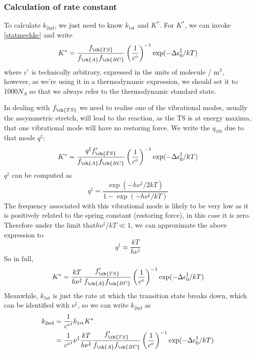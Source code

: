 \subsubsection{Calculation of rate constant}
To calculate $k_{\text{2nd}}$, we just need to know $k_{\text{1st}}$ and $K^*$. For $K^*$, we can invoke \cref{statmechkc} and write
\begin{equation}
  K^*=\frac{f_{\ch{TS}}}{f_{\ch{A}}f_{\ch{BC}}}\lf(\frac{1}{c^{\circ}} \rt)^{-1}\exp(-\Delta\ep_0^{\ddag}/kT)
\end{equation}
where $c^{\circ}$ is technically arbitrary, expressed in the units of molecule / m$^3$, however, as we're using it in a thermodynamic expression, we should set it to 1000$N_A$ so that we always refer to the thermodynamic standard state.\par
In dealing with $f_{\ch{TS}}$ we need to realise one of the vibrational modes, usually the assymmetric stretch, will lead to the reaction, as the TS is at energy maxima, that one vibrational mode will have no restoring force. We write the $q_{\text{vib}}$ due to that mode $q^{\ddag}$:
\begin{equation}
  K^*=\frac{q^{\ddag}f'_{\ch{TS}}}{f_{\ch{A}}f_{\ch{BC}}}\lf(\frac{1}{c^{\circ}} \rt)^{-1}\exp(-\Delta\ep_0^{\ddag}/kT)
\end{equation}
$q^{\ddag}$ can be computed as
\begin{equation}
  q^{\ddag}=\frac{\exp(-h\nu^{\ddag}/2kT)}{1-\exp(-h\nu^{\ddag}/kT)}
\end{equation}
The frequency associated with this vibrational mode is likely to be very low as it is positively related to the spring constant (restoring force), in this case it is zero. Therefore under the limit that$h\nu^{\ddag}/kT\ll1$, we can approximate the above expression to
\begin{equation}
  q^{\ddag}\approx\frac{kT}{h\nu^{\ddag}}
\end{equation}
So in full, 
\begin{equation}
\label{kstar}
  K^*=\frac{kT}{h\nu^{\ddag}}\frac{f'_{\ch{TS}}}{f_{\ch{A}}f_{\ch{BC}}}\lf(\frac{1}{c^{\circ}} \rt)^{-1}\exp(-\Delta\ep_0^{\ddag}/kT)
\end{equation}
Meanwhile, $k_{\text{1st}}$ is just the rate at which the transition state breaks down, which can be identified with $\nu^{\ddag}$, so we can write $k_{\text{2nd}}$ as
\begin{equation}
\begin{aligned}
  k_{\text{2nd}}&=\frac{1}{{c^{\circ}}'}k_{\text{1st}}K^*\\
  &=\frac{1}{{c^{\circ}}'}\nu^{\ddag} \frac{kT}{h\nu^{\ddag}}\frac{f'_{\ch{TS}}}{f_{\ch{A}}f_{\ch{BC}}}\lf(\frac{1}{c^{\circ}} \rt)^{-1}\exp(-\Delta\ep_0^{\ddag}/kT)
\end{aligned}
\end{equation}
